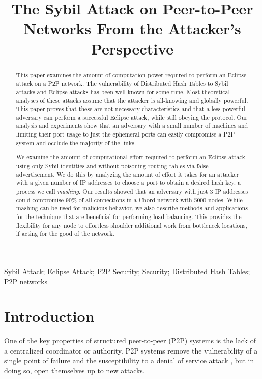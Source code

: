 \documentclass[11pt,conference]{IEEEtran}
\author{\IEEEauthorblockN{Andrew Rosen \qquad Brendan Benshoof \qquad Robert W. Harrison \qquad Anu G. Bourgeois}
    \IEEEauthorblockA{Department of Computer Science\\
        Georgia State University\\
        Atlanta, Georgia\\
        rosen@cs.gsu.edu \qquad  bbenshoof@cs.gsu.edu  \qquad rwh@cs.gsu.edu \qquad anu@cs.gsu.edu }
}
\title{The Sybil Attack on Peer-to-Peer Networks From the Attacker's Perspective}   %
\begin{document}
\maketitle



\begin{abstract}
This paper examines the amount of computation power required to perform an Eclipse attack on a P2P network.
The vulnerability of Distributed Hash Tables to Sybil attacks and Eclipse attacks has been well known for some time.
Most theoretical analyses of these attacks assume that the attacker is all-knowing and globally powerful.
This paper proves that these are not necessary characteristics and that a less powerful adversary can perform a successful Eclipse attack, while still obeying the protocol.%
Our analysis and experiments show that an adversary with a small number of machines and limiting their port usage to just the ephemeral ports can easily compromise a P2P system and occlude the majority of the links.

We examine the amount of computational effort required to perform an Eclipse attack using only Sybil identities and without poisoning routing tables via false advertisement.
We do this by analyzing the amount of effort it takes for an attacker with a given number of IP addresses to choose a port to obtain a desired hash key, a process we call \emph{mashing}.
Our results showed that an adversary with just 3 IP addresses could compromise 90\% of all connections in a Chord network with 5000 nodes.
While mashing can be used for malicious behavior, we also describe methods and applications for the technique that are beneficial for performing load balancing.
This provides the flexibility for any node to effortless shoulder additional work from bottleneck locations, if acting for the good of the network.
\end{abstract}

\begin{IEEEkeywords}
    Sybil Attack; Eclipse Attack; P2P Security; Security; Distributed Hash Tables; P2P networks
    
\end{IEEEkeywords}

\section{Introduction}
One of the key properties of structured peer-to-peer (P2P) systems is the lack of a centralized coordinator or authority.
P2P systems remove the vulnerability of a single point of failure and the susceptibility to a denial of service attack \cite{sybil}, but in doing so, open themselves up to new attacks.
\end{document}
